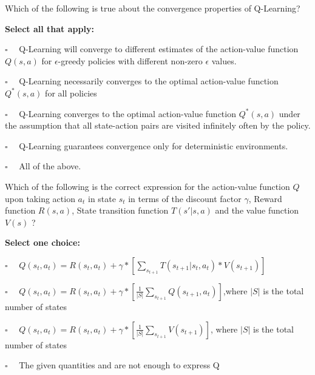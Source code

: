 \documentclass[11pt,addpoints,answers]{exam}
\newcommand{\emptysquare}{{\LARGE $\square$}\ \ }
\newcommand{\filledsquare}{{\LARGE $\boxtimes$}\ \ }
\begin{document}
\begin{questions}
    
    
    \question[2] Which of the following is true about the convergence properties of Q-Learning?
    
    
    \textbf{Select all that apply:}
    \begin{list}{}
        \item 
            \emptysquare 
            Q-Learning will converge to different estimates of the action-value function $Q(s,a)$ for $\epsilon$-greedy policies with different non-zero $\epsilon$ values.
        \item 
            \emptysquare 
            Q-Learning necessarily converges to the optimal action-value function $Q^*(s,a)$ for all policies
        \item 
            \emptysquare 
            Q-Learning converges to the optimal action-value function $Q^*(s,a)$ under the assumption that all state-action pairs are visited infinitely often by the policy.
        \item 
            \emptysquare 
            Q-Learning guarantees convergence only for deterministic environments.
        \item 
            \emptysquare 
            All of the above.
    \end{list}
    \clearpage
    \question[2] Which of the following is the correct expression for the  action-value function $Q$ upon taking action $a_t$ in state $s_t$ in terms of the discount factor $\gamma$, Reward function $R(s,a)$, State transition function $T(s'|s,a)$ and the value function $V(s)$ ? 
    
    
    \textbf{Select one choice:}
    \begin{list}{}
        \item 
            \emptysquare 
            $Q(s_t,a_t) = R(s_t,a_t) + \gamma*[\sum_{s_{t+1}}T(s_{t+1}| s_t,a_t)*V(s_{t+1})]$
        \item 
            \emptysquare
            $Q(s_t,a_t) = R(s_t,a_t) + \gamma*[\frac{1}{|S|}\sum_{s_{t+1}}Q(s_{t+1},a_t)]$,where $|S|$ is the total number of states
        \item 
            \emptysquare 
            $Q(s_t,a_t) = R(s_t,a_t) + \gamma*[\frac{1}{|S|}\sum_{s_{t+1}}V(s_{t+1})]$, where $|S|$ is the total number of states
        \item 
            \emptysquare 
            The given quantities and are not enough to express Q
    
    \end{list}
    
    
\end{questions}
\end{document}

